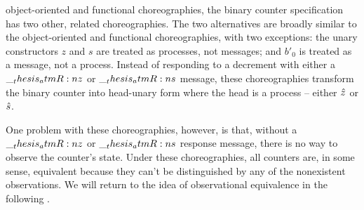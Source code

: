 


 object-oriented and functional choreographies, the binary counter specification has two other, related choreographies.
The two alternatives are broadly similar to the object-oriented and functional choreographies, with two exceptions: the unary constructors $z$ and $s$ are treated as processes, not messages; and $b'_0$ is treated as a message, not a process.
Instead of responding to a decrement with either a $\__thesis_atmR:n {z}$ or $\__thesis_atmR:n {s}$ message, these choreographies transform the binary counter into head-unary form where the head is a process -- either $\hat{z}$ or $\hat{s}$.

One problem with these choreographies, however, is that, without a $\__thesis_atmR:n {z}$ or $\__thesis_atmR:n {s}$ response message, there is no way to observe the counter's state.
Under these choreographies, all counters are, in some sense, equivalent because they can't be distinguished by any of the nonexistent observations.
We will return to the idea of observational equivalence in the following .

